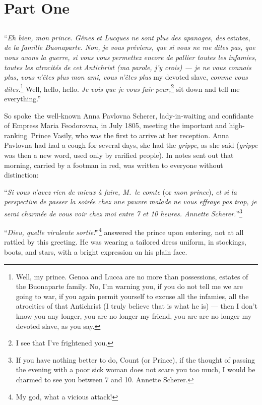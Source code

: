 \chapter{Part One}

\section{ }

``\textit{Eh bien, mon prince. G\^enes et Lucques ne sont plus des
  apanages, des} estates, \textit{de la famille Buonaparte. Non, je
  vous pr\'eviens, que si vous ne me dites pas, que nous avons la
  guerre, si vous vous permettez encore de pallier toutes les
  infamies, toutes les atrocit\'es de cet Antichrist (ma parole, j'y
  crois) --- je ne vous connais plus, vous n'\^etes plus mon ami, vous
  n'\^etes plus} my devoted slave, \textit{comme vous
  dites.}\footnote{Well, my prince. Genoa and Lucca are no more than
  possessions, estates of the Buonaparte family. No, I'm warning you,
  if you do not tell me we are going to war, if you again permit
  yourself to excuse all the infamies, all the atrocities of that
  Antichrist (I truly believe that is what he is) --- then I don't
  know you any longer, you are no longer my friend, you are are no
  longer my devoted slave, as you say.} Well, hello, hello. \textit{Je
  vois que je vous fair peur,}\footnote{I see that I've frightened
  you.} sit down and tell me everything.''

So spoke\ the well-known Anna Pavlovna
Scherer, lady-in-waiting and confidante of Empress Maria Feodorovna,
in July 1805, meeting the important and high-ranking\
Prince Vasily, who was the first to arrive at her reception. Anna
Pavlovna had had a cough for several days, she had the
\textit{grippe}, as she said (\textit{grippe} was then a new word,
used only by rarified people). In notes sent out that morning, carried
by a footman in red, was written to everyone without distinction:

``\textit{Si vous n'avez rien de mieux \`a faire, M.~le comte} (or
\textit{mon prince}), \textit{et si la perspective de passer la
  soir\'ee chez une pauvre malade ne vous effraye pas trop, je serai
  charm\'ee de vous voir chez moi entre 7 et 10 heures. Annette
  Scherer.}''\footnote{If you have nothing better to do, Count (or
  Prince), if the thought of passing the evening with a poor sick
  woman does not scare you too much, I would be charmed to see you
  between 7 and 10. Annette Scherer.}

``\textit{Dieu, quelle virulente sortie!}''\footnote{My god, what a
  vicious attack!} answered the prince upon entering, not at all
rattled by this greeting. He was wearing a tailored dress uniform, in
stockings, boots, and stars, with a bright expression on his plain
face.


